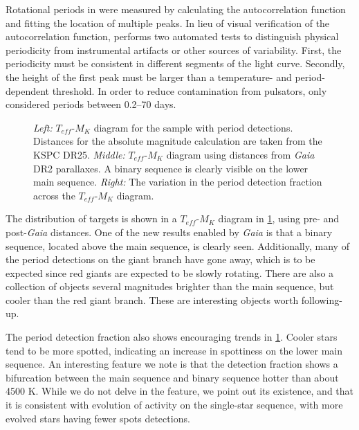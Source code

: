 \documentclass[manuscript]{aastex6}
\newcommand{\Gaia}{\mbox{\textit{Gaia}}}
\newcommand{\Teff}{\ensuremath{T_{eff}}}
\begin{document}
Rotational periods in \citet{McQuillan14} were measured by calculating the 
autocorrelation function and fitting the location of multiple peaks. In lieu 
of visual verification of the autocorrelation function, \citet{McQuillan14}
performs two automated tests to distinguish physical periodicity from
instrumental artifacts or other sources of variability. First, the 
periodicity must be consistent in different segments of the light curve.
Secondly, the height of the first peak must be larger than a temperature- and
period-dependent threshold. In order to reduce contamination from pulsators, 
\citet{McQuillan14} only considered periods between 0.2--70 days.

\begin{figure}[htb]
    \centering
    \caption{\emph{Left:} \Teff-\(M_K\) diagram for the \citet{McQuillan14}
    sample with period detections. Distances for the absolute magnitude
calculation are taken from the KSPC DR25. \emph{Middle:} \Teff-\(M_K\) diagram
using distances from \Gaia{} DR2 parallaxes. A binary sequence is clearly
visible on the lower main sequence. \emph{Right:} The variation in the 
\citet{McQuillan14} period detection fraction across the \Teff-\(M_K\) diagram. }
    \label{fig:mcquillan_selection}
\end{figure}

The distribution of \citet{McQuillan14} targets is shown in a \Teff-\(M_K\)
diagram in \cref{fig:mcquillan_selection}, using pre- and post-\Gaia{}
distances. One of the new results enabled by \Gaia{} is that a binary sequence,
located above the main sequence, is clearly seen. Additionally, many of the
period detections on the giant branch have gone away, which is to be expected
since red giants are expected to be slowly rotating. There are also a
collection of objects several magnitudes brighter than the main sequence, but
cooler than the red giant branch. These are interesting objects worth
following-up.

The period detection fraction also shows encouraging trends in
\cref{fig:mcquillan_selection}. Cooler stars tend
to be more spotted, indicating an increase in spottiness on the lower main
sequence. An interesting feature we note is that the detection fraction shows a
bifurcation between the main sequence and binary sequence hotter than about
4500 K. While we do not delve in the feature, we point out its existence, and
that it is consistent with evolution of activity on the single-star sequence, 
with more evolved stars having fewer spots detections.
\end{document}
